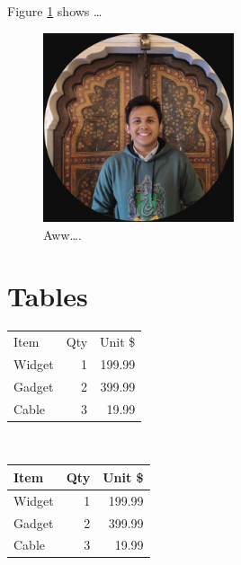 \documentclass{article}
\begin{document}
Figure \ref{fig:gerbil} shows \ldots

\begin{figure}
\centering
\includegraphics[width=0.5\textwidth]{1}
\caption{\label{fig:gerbil}Aww\ldots.}
\end{figure}

\newpage
\newpage
\section*{Tables}

\begin{tabular}{lrr}
Item & Qty & Unit \$ \\
Widget & 1 & 199.99 \\
Gadget & 2 & 399.99 \\
Cable & 3 & 19.99 \\
\end{tabular}
\\[6pt]

\begin{tabular}{|l|r|r|} \hline
Item & Qty & Unit \$ \\\hline
Widget & 1 & 199.99 \\
Gadget & 2 & 399.99 \\
Cable & 3 & 19.99 \\\hline
\end{tabular}

\end{document}
